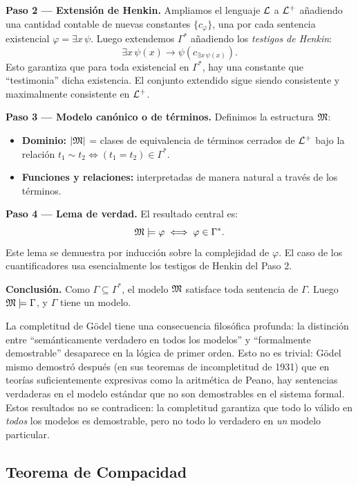 \textbf{Paso 2 — Extensión de Henkin.} Ampliamos el lenguaje $\mathcal{L}$ a $\mathcal{L}^+$ añadiendo una cantidad contable de nuevas constantes $\{c_{\varphi}\}$, una por cada sentencia existencial $\varphi = \exists x\, \psi$. Luego extendemos $\Gamma^*$ añadiendo los \emph{testigos de Henkin}:
\[
  \exists x\, \psi(x) \to \psi(c_{\exists x\,\psi(x)}).
\]
Esto garantiza que para toda existencial en $\Gamma^*$, hay una constante que ``testimonia'' dicha existencia. El conjunto extendido sigue siendo consistente y maximalmente consistente en $\mathcal{L}^+$.

\textbf{Paso 3 — Modelo canónico o de términos.} Definimos la estructura $\mathfrak{M}$:
\begin{itemize}
  \item \textbf{Dominio:} $|\mathfrak{M}|$ = clases de equivalencia de términos cerrados de $\mathcal{L}^+$ bajo la relación $t_1 \sim t_2 \iff (t_1 = t_2) \in \Gamma^*$.
  \item \textbf{Funciones y relaciones:} interpretadas de manera natural a través de los términos.
\end{itemize}

\textbf{Paso 4 — Lema de verdad.} El resultado central es:
\[
  \mathfrak{M} \models \varphi \iff \varphi \in \Gamma^*.
\]
Este lema se demuestra por inducción sobre la complejidad de $\varphi$. El caso de los cuantificadores usa esencialmente los testigos de Henkin del Paso 2.

\textbf{Conclusión.} Como $\Gamma \subseteq \Gamma^*$, el modelo $\mathfrak{M}$ satisface toda sentencia de $\Gamma$. Luego $\mathfrak{M} \models \Gamma$, y $\Gamma$ tiene un modelo.

\begin{importante}
La completitud de Gödel tiene una consecuencia filosófica profunda: la distinción entre ``semánticamente verdadero en todos los modelos'' y ``formalmente demostrable'' desaparece en la lógica de primer orden. Esto no es trivial: Gödel mismo demostró después (en sus teoremas de incompletitud de 1931) que en teorías suficientemente expresivas como la aritmética de Peano, hay sentencias verdaderas en el modelo estándar que no son demostrables en el sistema formal. Estos resultados no se contradicen: la completitud garantiza que todo lo válido en \emph{todos} los modelos es demostrable, pero no todo lo verdadero en \emph{un} modelo particular.
\end{importante}

\subsection{Teorema de Compacidad}

